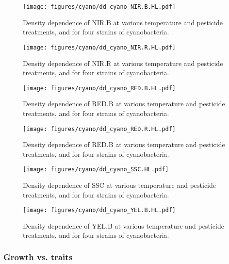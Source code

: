 \begin{figure}[hbt!]
    \centering
    \texttt{[image: figures/cyano/dd\_cyano\_NIR.B.HL.pdf]}
    \caption{Density dependence of NIR.B at various temperature and pesticide treatments, and for four strains of cyanobacteria.}
    \label{fig:dd_cyano_NIR.B.HL}
\end{figure}

\begin{figure}[hbt!]
    \centering
    \texttt{[image: figures/cyano/dd\_cyano\_NIR.R.HL.pdf]}
    \caption{Density dependence of NIR.R at various temperature and pesticide treatments, and for four strains of cyanobacteria.}
    \label{fig:dd_cyano_NIR.R.HL}
\end{figure}

\begin{figure}[hbt!]
    \centering
    \texttt{[image: figures/cyano/dd\_cyano\_RED.B.HL.pdf]}
    \caption{Density dependence of RED.B at various temperature and pesticide treatments, and for four strains of cyanobacteria.}
    \label{fig:dd_cyano_RED.B.HL}
\end{figure}

\begin{figure}[hbt!]
    \centering
    \texttt{[image: figures/cyano/dd\_cyano\_RED.R.HL.pdf]}
    \caption{Density dependence of RED.B at various temperature and pesticide treatments, and for four strains of cyanobacteria.}
    \label{fig:dd_cyano_RED.R.HL}
\end{figure}

\begin{figure}[hbt!]
    \centering
    \texttt{[image: figures/cyano/dd\_cyano\_SSC.HL.pdf]}
    \caption{Density dependence of SSC at various temperature and pesticide treatments, and for four strains of cyanobacteria.}
    \label{fig:dd_cyano_SSC.HL}
\end{figure}

\begin{figure}[hbt!]
    \centering
    \texttt{[image: figures/cyano/dd\_cyano\_YEL.B.HL.pdf]}
    \caption{Density dependence of YEL.B at various temperature and pesticide treatments, and for four strains of cyanobacteria.}
    \label{fig:dd_cyano_YEL.B.HL}
\end{figure}

\clearpage

\subsubsection{Growth vs. traits}

